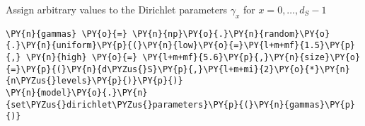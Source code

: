 \documentclass[10pt, article,table]{article}
\begin{document}
    Assign arbitrary values to the Dirichlet parameters \(\gamma_{x}\) for
\(x = 0,\dots,d_{S}-1\)
\begin{tcolorbox}[breakable, size=fbox, boxrule=1pt, pad at break*=1mm,colback=cellbackground, colframe=cellborder]
\begin{Verbatim}[commandchars=\\\{\}]
\PY{n}{gammas} \PY{o}{=} \PY{n}{np}\PY{o}{.}\PY{n}{random}\PY{o}{.}\PY{n}{uniform}\PY{p}{(}\PY{n}{low}\PY{o}{=}\PY{l+m+mf}{1.5}\PY{p}{,} \PY{n}{high} \PY{o}{=} \PY{l+m+mf}{5.6}\PY{p}{,}\PY{n}{size}\PY{o}{=}\PY{p}{(}\PY{n}{d\PYZus{}S}\PY{p}{,}\PY{l+m+mi}{2}\PY{o}{*}\PY{n}{n\PYZus{}levels}\PY{p}{)}\PY{p}{)}
\PY{n}{model}\PY{o}{.}\PY{n}{set\PYZus{}dirichlet\PYZus{}parameters}\PY{p}{(}\PY{n}{gammas}\PY{p}{)}
\end{Verbatim}
\end{tcolorbox}
\end{document}
